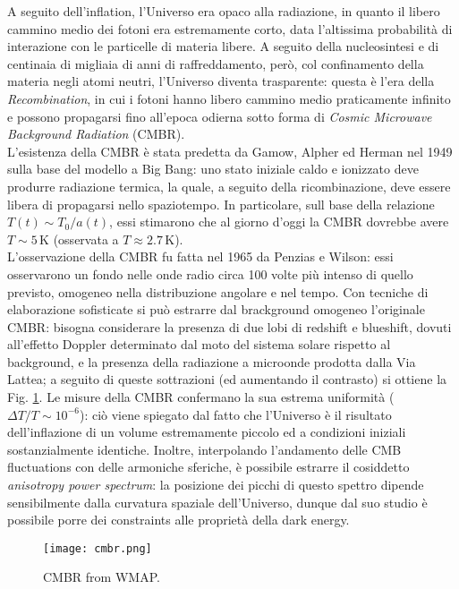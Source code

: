A seguito dell'inflation, l'Universo era opaco alla radiazione, in quanto il libero cammino medio dei fotoni era estremamente corto, data l'altissima probabilità di interazione con le particelle di materia libere. A seguito della nucleosintesi e di centinaia di migliaia di anni di raffreddamento, però, col confinamento della materia negli atomi neutri, l'Universo diventa trasparente: questa è l'era della \textit{Recombination}, in cui i fotoni hanno libero cammino medio praticamente infinito e possono propagarsi fino all'epoca odierna sotto forma di \textit{Cosmic Microwave Background Radiation} (CMBR).\\
L'esistenza della CMBR è stata predetta da Gamow, Alpher ed Herman nel 1949 sulla base del modello a Big Bang: uno stato iniziale caldo e ionizzato deve produrre radiazione termica, la quale, a seguito della ricombinazione, deve essere libera di propagarsi nello spaziotempo. In particolare, sull base della relazione $ T(t) \sim T_0 / a(t) $, essi stimarono che al giorno d'oggi la CMBR dovrebbe avere $ T \sim 5 \,\text{K} $ (osservata a $ T \approx 2.7 \,\text{K} $).\\
L'osservazione della CMBR fu fatta nel 1965 da Penzias e Wilson: essi osservarono un fondo nelle onde radio circa 100 volte più intenso di quello previsto, omogeneo nella distribuzione angolare e nel tempo. Con tecniche di elaborazione sofisticate si può estrarre dal brackground omogeneo l'originale CMBR: bisogna considerare la presenza di due lobi di redshift e blueshift, dovuti all'effetto Doppler determinato dal moto del sistema solare rispetto al background, e la presenza della radiazione a microonde prodotta dalla Via Lattea; a seguito di queste sottrazioni (ed aumentando il contrasto) si ottiene la Fig. \ref{cmbr}.
Le misure della CMBR confermano la sua estrema uniformità ($ \Delta T / T \sim 10^{-6} $): ciò viene spiegato dal fatto che l'Universo è il risultato dell'inflazione di un volume estremamente piccolo ed a condizioni iniziali sostanzialmente identiche. Inoltre, interpolando l'andamento delle CMB fluctuations con delle armoniche sferiche, è possibile estrarre il cosiddetto \textit{anisotropy power spectrum}: la posizione dei picchi di questo spettro dipende sensibilmente dalla curvatura spaziale dell'Universo, dunque dal suo studio è possibile porre dei constraints alle proprietà della dark energy.

\begin{figure}
	\centering
	\texttt{[image: cmbr.png]}
	\caption{CMBR from WMAP.}
	\label{cmbr}
\end{figure}










